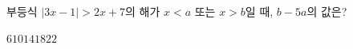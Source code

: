 부등식 $|3x-1|>2x+7$의 해가 $x<a$ 또는 $x>b$일 때, $b-5a$의 값은?
\begin{choices32}{$6$}{$10$}{$14$}{$18$}{$22$}\end{choices32}
